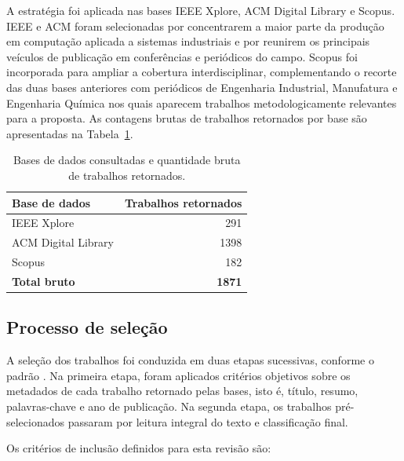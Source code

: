 A estratégia foi aplicada nas bases IEEE Xplore, ACM Digital Library e Scopus. IEEE e ACM foram selecionadas por concentrarem a maior parte da produção em computação aplicada a sistemas industriais e por reunirem os principais veículos de publicação em conferências e periódicos do campo. Scopus foi incorporada para ampliar a cobertura interdisciplinar, complementando o recorte das duas bases anteriores com periódicos de Engenharia Industrial, Manufatura e Engenharia Química nos quais aparecem trabalhos metodologicamente relevantes para a proposta. As contagens brutas de trabalhos retornados por base são apresentadas na Tabela~\ref{tab:bases_busca}.

\begin{table}[htbp]
    \centering
    \footnotesize
    \caption{Bases de dados consultadas e quantidade bruta de trabalhos retornados.}
    \label{tab:bases_busca}
    \begin{tabular}{lr}
        \toprule
        \textbf{Base de dados} & \textbf{Trabalhos retornados} \\
        \midrule
        IEEE Xplore           & 291 \\
        ACM Digital Library   & 1398 \\
        Scopus                & 182 \\
        \midrule
        \textbf{Total bruto}  & \textbf{1871} \\
        \bottomrule
    \end{tabular}
\end{table}


\subsection{Processo de seleção}
\label{subsec:processo_selecao}

A seleção dos trabalhos foi conduzida em duas etapas sucessivas, conforme o padrão . Na primeira etapa, foram aplicados critérios objetivos sobre os metadados de cada trabalho retornado pelas bases, isto é, título, resumo, palavras-chave e ano de publicação. Na segunda etapa, os trabalhos pré-selecionados passaram por leitura integral do texto e classificação final.

Os critérios de inclusão definidos para esta revisão são:

